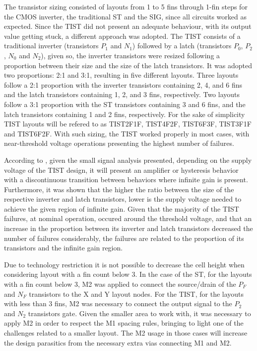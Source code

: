 \documentclass[pgmicro,mestrado,english]{iiufrgs}
\begin{document}
The transistor sizing consisted of layouts from 1 to 5 fins through 1-fin steps for the CMOS inverter, the traditional ST and the SIG, since all circuits worked as expected. Since the TIST did not present an adequate behaviour, with its output value getting stuck, a different approach was adopted. The TIST consists of a traditional inverter (transistors $P_1$ and $N_1$) followed by a latch (transistors $P_0$, $P_2$, $N_0$ and $N_2$), given so, the inverter transistors were resized following a proportion between their size and the size of the latch transistors. It was adopted two proportions: 2:1 and 3:1, resulting in five different layouts. Three layouts follow a 2:1 proportion with the inverter transistors containing 2, 4, and 6 fins and the latch transistors containing 1, 2, and 3 fins, respectively. Two layouts follow a 3:1 proportion with the ST transistors containing 3 and 6 fins, and the latch transistors containing 1 and 2 fins, respectively. For the sake of simplicity TIST layouts will be refered to as TIST2F1F, TIST4F2F, TIST6F3F, TIST3F1F and TIST6F2F. With such sizing, the TIST worked properly in most cases, with near-threshold voltage operations presenting the highest number of failures.

According to \cite{thiagoTIST}, given the small signal analysis presented, depending on the supply voltage of the TIST design, it will present an amplifier or hysteresis behavior with a discontinuous transition between behaviors where infinite gain is present. Furthermore, it was shown that the higher the ratio between the size of the respective inverter and latch transistors, lower is the supply voltage needed to achieve the given region of infinite gain. Given that the majority of the TIST failures, at nominal operation, occured around the threshold voltage, and that an increase in the proportion between its inverter and latch transistors decreased the number of failures considerably, the failures are related to the proportion of its transistors and the infinite gain region.

Due to technology restriction it is not possible to decrease the cell height when considering layout with a fin count below 3. In the case of the ST, for the layouts with a fin count below 3, M2 was applied to connect the source/drain of the ${P_F}$ and ${N_F}$ transistors to the X and Y layout nodes. For the TIST, for the layouts with less than 3 fins, M2 was necessary to connect the output signal to the $P_2$ and $N_2$ transistors gate. Given the smaller area to work with, it was necessary to apply M2 in order to respect the M1 spacing rules, bringing to light one of the challenges related to a smaller layout. The M2 usage in those cases will increase the design parasitics from the necessary extra vias connecting M1 and M2. 
\end{document}
